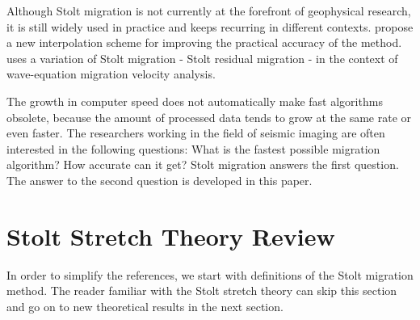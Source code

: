 Although Stolt migration is not currently at the forefront of
geophysical research, it is still widely used in practice
\cite{yilmaz,yilmazLE} and keeps recurring in different contexts.
 propose a new interpolation scheme for improving the
practical accuracy of the method.  uses a variation of
Stolt migration - Stolt residual migration \cite{GEO61-02-06050607} -
in the context of wave-equation migration velocity analysis.

The growth in computer speed does not automatically make fast
algorithms obsolete, because the amount of processed data tends to
grow at the same rate or even faster. The researchers working in the
field of seismic imaging are often interested in the following
questions: What is the fastest possible migration algorithm?  How
accurate can it get? Stolt migration answers the first question.  The
answer to the second question is developed in this paper.

\section{Stolt Stretch Theory Review}

In order to simplify the references, we start with definitions of the
Stolt migration method. The reader familiar with the Stolt stretch
theory can skip this section and go on to new theoretical results in
the next section.

